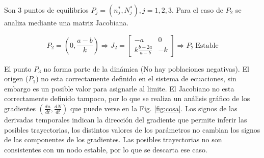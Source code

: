 \documentclass[twocolumn,aps,prl]{revtex4-1}
\newcommand{\nstar}{n^*}
\newcommand{\Nstar}{N^*}
\begin{document}




Son 3 puntos de equilibrios $P_j = (\nstar_{j},\Nstar_{j}), j= 1, 2, 3$. Para el caso de $P_2$ se analiza mediante una matriz Jacobiana.







$$
P_2 = \left( 0, \frac{a-b}{k} \right)  \Rightarrow  
J_2 = 
\begin{bmatrix}
    -a & 0  \\
    k \frac{b - 2a}{ a - b } & -k 
\end{bmatrix}
\Rightarrow  P_2 \ \text{Estable}
$$

El punto $P_3$ no forma parte de la dinámica (No hay poblaciones negativas). 
El origen ($P_1$) no esta correctamente definido en el sistema de ecuaciones, sin embargo es un posible valor para asignarle al limite. El Jacobiano no esta correctamente definido tampoco, por lo que se realiza un análisis gráfico de los gradientes $(\frac{dn}{dt}, \frac{dN}{dt})$ que puede verse en la Fig. \ref{fig:cosa}. Los signos de las derivadas temporales indican la dirección del gradiente que permite inferir las posibles trayectorias, los distintos valores de los parámetros no cambian los signos de las componentes de los gradientes. Las posibles trayectorias no son consistentes con un nodo estable, por lo que se descarta ese caso.
\end{document}
